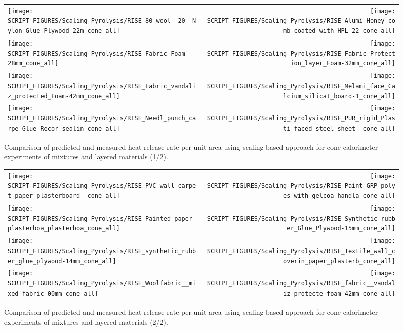 \begin{figure}[!h]
\begin{tabular*}{\textwidth}{l@{\extracolsep{\fill}}r}
\texttt{[image: SCRIPT\_FIGURES/Scaling\_Pyrolysis/RISE\_80\_wool\_\_20\_\_Nylon\_Glue\_Plywood-22m\_cone\_all]} &
\texttt{[image: SCRIPT\_FIGURES/Scaling\_Pyrolysis/RISE\_Alumi\_Honey\_comb\_coated\_with\_HPL-22\_cone\_all]} \\
\texttt{[image: SCRIPT\_FIGURES/Scaling\_Pyrolysis/RISE\_Fabric\_Foam-28mm\_cone\_all]} &
\texttt{[image: SCRIPT\_FIGURES/Scaling\_Pyrolysis/RISE\_Fabric\_Protection\_layer\_Foam-32mm\_cone\_all]} \\
\texttt{[image: SCRIPT\_FIGURES/Scaling\_Pyrolysis/RISE\_Fabric\_vandaliz\_protected\_Foam-42mm\_cone\_all]} &
\texttt{[image: SCRIPT\_FIGURES/Scaling\_Pyrolysis/RISE\_Melami\_face\_Calcium\_silicat\_board-1\_cone\_all]} \\
\texttt{[image: SCRIPT\_FIGURES/Scaling\_Pyrolysis/RISE\_Needl\_punch\_carpe\_Glue\_Recor\_sealin\_cone\_all]} &
\texttt{[image: SCRIPT\_FIGURES/Scaling\_Pyrolysis/RISE\_PUR\_rigid\_Plasti\_faced\_steel\_sheet-\_cone\_all]} \\
\end{tabular*}
\caption[HRRPUA of RISE materials using scaling model, mixtures and layered materials]
{Comparison of predicted and measured heat release rate per unit area using scaling-based approach for cone calorimeter experiments of mixtures and layered materials (1/2).}
\label{RISE_Materials_mixtures1}
\end{figure}

\begin{figure}[!h]
\begin{tabular*}{\textwidth}{l@{\extracolsep{\fill}}r}
\texttt{[image: SCRIPT\_FIGURES/Scaling\_Pyrolysis/RISE\_PVC\_wall\_carpet\_paper\_plasterboard-\_cone\_all]} &
\texttt{[image: SCRIPT\_FIGURES/Scaling\_Pyrolysis/RISE\_Paint\_GRP\_polyes\_with\_gelcoa\_handla\_cone\_all]} \\
\texttt{[image: SCRIPT\_FIGURES/Scaling\_Pyrolysis/RISE\_Painted\_paper\_plasterboa\_plasterboa\_cone\_all]} &
\texttt{[image: SCRIPT\_FIGURES/Scaling\_Pyrolysis/RISE\_Synthetic\_rubber\_Glue\_Plywood-15mm\_cone\_all]} \\
\texttt{[image: SCRIPT\_FIGURES/Scaling\_Pyrolysis/RISE\_synthetic\_rubber\_glue\_plywood-14mm\_cone\_all]} &
\texttt{[image: SCRIPT\_FIGURES/Scaling\_Pyrolysis/RISE\_Textile\_wall\_coverin\_paper\_plasterb\_cone\_all]} \\
\texttt{[image: SCRIPT\_FIGURES/Scaling\_Pyrolysis/RISE\_Woolfabric\_\_mixed\_fabric-00mm\_cone\_all]} &
\texttt{[image: SCRIPT\_FIGURES/Scaling\_Pyrolysis/RISE\_fabric\_\_vandaliz\_protecte\_foam-42mm\_cone\_all]} \\
\end{tabular*}
\caption[HRRPUA of RISE materials using scaling model, mixtures and layered materials]
{Comparison of predicted and measured heat release rate per unit area using scaling-based approach for cone calorimeter experiments of mixtures and layered materials (2/2).}
\label{RISE_Materials_mixtures2}
\end{figure}

